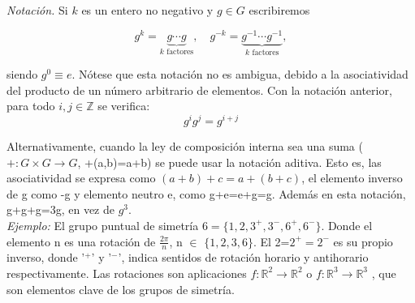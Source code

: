 \documentclass{report}
\begin{document}
\textit{Notación.} Si \( k \) es un entero no negativo y \( g \in G \) escribiremos

\[
g^k = \underbrace{g \cdots g}_{k \text{ factores}}, \quad 
g^{-k} = \underbrace{g^{-1} \cdots g^{-1}}_{k \text{ factores}},
\]

siendo \( g^0 \equiv e \). Nótese que esta notación no es ambigua, debido a la asociatividad del producto de un número arbitrario de elementos. Con la notación anterior, para todo \( i, j \in \mathbb{Z} \) se verifica:
\[
g^i g^j = g^{i+j}
\]

Alternativamente, cuando la ley de composición interna sea una suma ($+:G\times G \rightarrow G$, +(a,b)=a+b) se puede usar la notación aditiva. Esto es, las asociatividad se expresa como $(a+b)+c=a+(b+c)$, el elemento inverso de g como -g y elemento neutro e, como g+e=e+g=g. Además en esta notación, g+g+g=3g, en vez de $g^3$.\\

\vspace{.5cm}
\textit{Ejemplo: }El grupo puntual de simetría $6=\{1,2,3^+,3^-,6^+,6^-\}$. Donde el elemento n es una rotación de $\frac{2\pi}{n}$, n $\in$ $\{1,2,3,6 \}$. El 2=$2^+=2^-$ es su propio inverso, donde '$^+$' y '$^-$', indica sentidos de rotación horario y antihorario respectivamente. Las rotaciones son aplicaciones $f:\mathbb{R}^2\rightarrow \mathbb{R}^2$ o $f:\mathbb{R}^3\rightarrow \mathbb{R}^3$ , que son elementos clave de los grupos de simetría.
\end{document}
